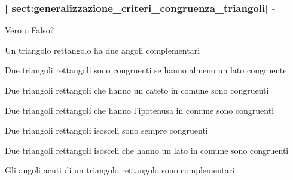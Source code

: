 \begingroup
\hypersetup{linkcolor=black}
\subsubsection*{\ref{
sect:generalizzazione_criteri_congruenza_triangoli} - 
}
\endgroup

\begin{esercizio}
\label{ese:3.52}
Vero o Falso?
\begin{enumeratea}
\item Un triangolo rettangolo ha due angoli 
complementari\hfill\boxV\quad\boxF
\item Due triangoli rettangoli sono congruenti se hanno almeno un 
lato congruente\hfill\boxV\quad\boxF
\item Due triangoli rettangoli che hanno un cateto in comune sono 
congruenti\hfill\boxV\quad\boxF
\item Due triangoli rettangoli che hanno l'ipotenusa in comune sono 
congruenti\hfill\boxV\quad\boxF
\item Due triangoli rettangoli isosceli sono sempre 
congruenti\hfill\boxV\quad\boxF
\item Due triangoli rettangoli isosceli che hanno un lato in comune 
sono congruenti\hfill\boxV\quad\boxF
\item Gli angoli acuti di un triangolo rettangolo sono 
complementari\hfill\boxV\quad\boxF
\end{enumeratea}
\end{esercizio}

